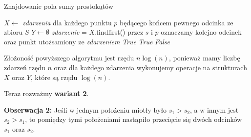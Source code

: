 \begin{algorithm}[H]
	\caption{Znajdowanie pola sumy prostokątów}
	\begin{algorithmic}[1]
		\State $X \gets$ \textit{zdarzenia} dla każdego punktu $p$ będącego
		końcem pewnego odcinka ze zbioru $S$
		\State $Y \gets \emptyset$
		\State \textit{zdarzenie} = $X.$findfirst()
		\State przez $s$ i $p$ oznaczamy
		kolejno odcinek oraz punkt utożsamiony ze \textit{zdarzeniem}
		\State \Return \textit{True}
		\EndIf
		\Else
		\State \Return \textit{True}
		\EndIf
		\EndIf
		\EndWhile
		\State \Return \textit{False}
		\EndProcedure
	\end{algorithmic}
	\label{HasIntersectingSegments1}
\end{algorithm}

Złożoność powyższego algorytmu jest rzędu $n\log(n)$, ponieważ mamy liczbę zdarzeń
rzędu $n$ oraz dla każdego zdarzenia wykonujemy operacje na strukturach $X$ 
oraz $Y$, które są rzędu $\log(n)$.

Teraz rozważmy \textbf{wariant 2}.

\textbf{Obserwacja 2:} Jeśli w jednym położeniu miotły było $s_1 > s_2$, a w innym 
jest $s_2 > s_1$, to pomiędzy tymi położeniami nastąpiło przecięcie się
dwóch odcinków $s_1$ oraz $s_2$.

\subsection{}

